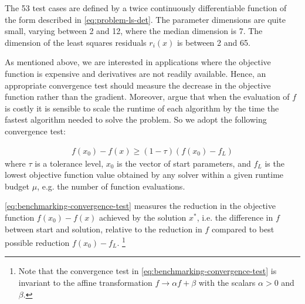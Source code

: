 \noindent The 53 test cases are defined by a twice continuously differentiable function of the form described in \ref{eq:problem-ls-det}. The parameter dimensions are quite small, varying between 2 and 12,
where the median dimension is 7. The dimension of the least squares residuals $r_i(x)$ is between 2 and 65.



\noindent As mentioned above, we are interested in applications where the objective function is expensive and derivatives are not readily available. Hence, an appropriate convergence test should measure the decrease in the objective function rather than the gradient.
Moreover, \cite{MoreWild2009} argue that when the evaluation of $f$ is costly it is sensible to scale the runtime of each algorithm by the time the fastest algorithm needed to solve the problem. So we adopt the following convergence test:


\begin{align}
        f(x_0) - f(x) \geq (1 - \tau)(f(x_0) - f_L)
        \label{eq:benchmarking-convergence-test}
\end{align}
where $\tau$ is a tolerance level, $x_0$ is the vector of start parameters, and $f_L$ is the lowest objective function value obtained by any solver within a given runtime budget $\mu$, e.g. the number of function evaluations.

\noindent \ref{eq:benchmarking-convergence-test} measures the reduction in the objective function $f(x_0) - f(x)$ achieved by the solution $x^*$, i.e. the difference in $f$ between start and solution, relative to the reduction in $f$ compared to best possible reduction $f(x_0) - f_L$.
\footnote{Note that the convergence test in \ref{eq:benchmarking-convergence-test} is invariant to the affine transformation $f \rightarrow \alpha f + \beta$ with the scalars $\alpha > 0$ and $\beta$.}


